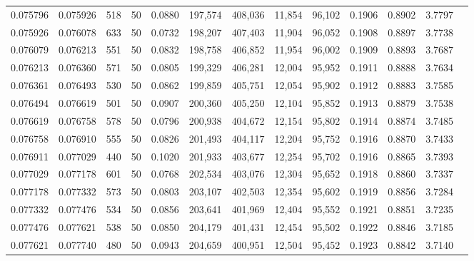 \begin{tabular}{rrrrrrrrrrrrr}
0.075796 & 0.075926 &   518 &  50 &                                     0.0880 & 197,574 & 408,036 &  11,854 &  96,102 & 0.1906 & 0.8902 & 3.7797 \\
0.075926 & 0.076078 &   633 &  50 &                                     0.0732 & 198,207 & 407,403 &  11,904 &  96,052 & 0.1908 & 0.8897 & 3.7738 \\
0.076079 & 0.076213 &   551 &  50 &                                     0.0832 & 198,758 & 406,852 &  11,954 &  96,002 & 0.1909 & 0.8893 & 3.7687 \\
0.076213 & 0.076360 &   571 &  50 &                                     0.0805 & 199,329 & 406,281 &  12,004 &  95,952 & 0.1911 & 0.8888 & 3.7634 \\
0.076361 & 0.076493 &   530 &  50 &                                     0.0862 & 199,859 & 405,751 &  12,054 &  95,902 & 0.1912 & 0.8883 & 3.7585 \\
0.076494 & 0.076619 &   501 &  50 &                                     0.0907 & 200,360 & 405,250 &  12,104 &  95,852 & 0.1913 & 0.8879 & 3.7538 \\
0.076619 & 0.076758 &   578 &  50 &                                     0.0796 & 200,938 & 404,672 &  12,154 &  95,802 & 0.1914 & 0.8874 & 3.7485 \\
0.076758 & 0.076910 &   555 &  50 &                                     0.0826 & 201,493 & 404,117 &  12,204 &  95,752 & 0.1916 & 0.8870 & 3.7433 \\
0.076911 & 0.077029 &   440 &  50 &                                     0.1020 & 201,933 & 403,677 &  12,254 &  95,702 & 0.1916 & 0.8865 & 3.7393 \\
0.077029 & 0.077178 &   601 &  50 &                                     0.0768 & 202,534 & 403,076 &  12,304 &  95,652 & 0.1918 & 0.8860 & 3.7337 \\
0.077178 & 0.077332 &   573 &  50 &                                     0.0803 & 203,107 & 402,503 &  12,354 &  95,602 & 0.1919 & 0.8856 & 3.7284 \\
0.077332 & 0.077476 &   534 &  50 &                                     0.0856 & 203,641 & 401,969 &  12,404 &  95,552 & 0.1921 & 0.8851 & 3.7235 \\
0.077476 & 0.077621 &   538 &  50 &                                     0.0850 & 204,179 & 401,431 &  12,454 &  95,502 & 0.1922 & 0.8846 & 3.7185 \\
0.077621 & 0.077740 &   480 &  50 &                                     0.0943 & 204,659 & 400,951 &  12,504 &  95,452 & 0.1923 & 0.8842 & 3.7140 \\

\end{tabular}
